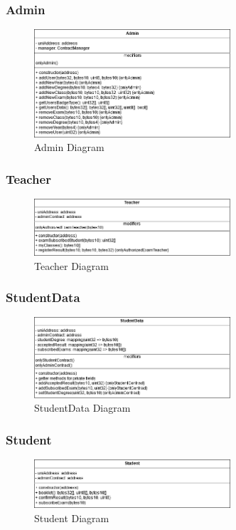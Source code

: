 \subsubsection{Admin}
\begin{figure}[!h]
	\centering
	\includegraphics[width=0.65\textwidth]{img/Contracts/Admin.png}
	\caption{Admin Diagram}
\end{figure}
\clearpage
\subsubsection{Teacher}
\begin{figure}[!h]
	\centering
	\includegraphics[width=0.65\textwidth]{img/Contracts/Teacher.png}
	\caption{Teacher Diagram}
\end{figure}
\subsubsection{StudentData}
\begin{figure}[!h]
	\centering
	\includegraphics[width=0.65\textwidth]{img/Contracts/StudentData.png}
	\caption{StudentData Diagram}
\end{figure}

\subsubsection{Student}
\begin{figure}[!h]
	\centering
	\includegraphics[width=0.65\textwidth]{img/Contracts/Student.png}
	\caption{Student Diagram}
\end{figure}
\clearpage
